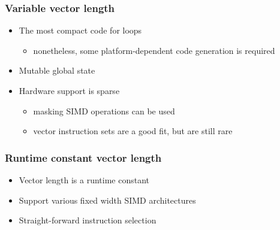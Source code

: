 \documentclass[t,aspectratio=169, xcolor={table}]{beamer}
\begin{document}
\begin{frame}
\frametitle{Variable vector length}
  \begin{itemize}
  \item The most compact code for loops
    \begin{itemize}
    \item nonetheless, some platform-dependent code generation is required
    \end{itemize}
  \item Mutable global state
  \item Hardware support is sparse
    \begin{itemize}
    \item masking SIMD operations can be used
    \item vector instruction sets are a good fit, but are still rare
    \end{itemize}
  \end{itemize}
\end{frame}
\begin{frame}
\frametitle{Runtime constant vector length}
  \begin{itemize}
  \item Vector length is a runtime constant
  \item Support various fixed width SIMD architectures
  \item Straight-forward instruction selection
  \end{itemize}
\end{frame}
\end{document}
